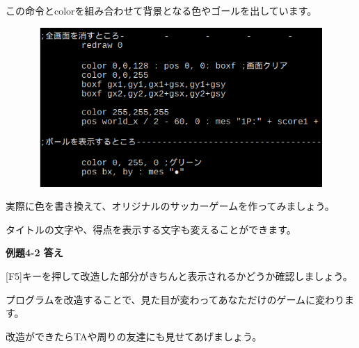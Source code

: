 \documentclass[a4paper,dvipdfmx]{jarticle}
\newcommand\textstyleqwerty[1]{#1}
\begin{document}
この命令とcolorを組み合わせて背景となる色やゴールを出しています。



\begin{center}
\includegraphics[width=14.499cm,height=6.059cm]{text04-img/text04-img008.png}

\end{center}

\bigskip


\bigskip


\bigskip


\bigskip


\bigskip


\bigskip


\bigskip


\bigskip


\bigskip


\bigskip


\bigskip


\bigskip


\bigskip


\bigskip


\bigskip

実際に色を書き換えて、オリジナルのサッカーゲームを作ってみましょう。

タイトルの文字や、得点を表示する文字も変えることができます。


\bigskip


\bigskip

{\bfseries
例題4-2 答え}


\bigskip

[F5]キーを押して改造した部分がきちんと表示されるかどうか確認しましょう。

\textstyleqwerty{プログラムを改造することで、見た目が変わってあなただけのゲームに変わります。}

改造ができたらTAや周りの友達にも見せてあげましょう。


\bigskip
\end{document}
